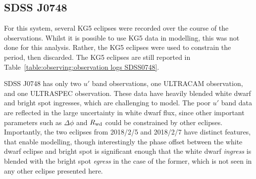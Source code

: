 \newpage
\subsection{SDSS J0748}

For this system, several KG5 eclipses were recorded over the course of the observations. Whilst it is possible to use KG5 data in modelling, this was not done for this analysis. Rather, the KG5 eclipses were used to constrain the period, then discarded. The KG5 eclipses are still reported in Table~\ref{table:observing:observation logs SDSS0748}.

SDSS J0748 has only two $u'$ band observations, one ULTRACAM observation, and one ULTRASPEC observation. These data have heavily blended white dwarf and bright spot ingresses, which are challenging to model.
The poor $u'$ band data are reflected in the large uncertainty in white dwarf flux, since other important parameters such as $\Delta\phi$ and $R_{\rm wd}$ could be constrained by other eclipses. Importantly, the two eclipses from 2018/2/5 and 2018/2/7 have distinct features, that enable modelling, though interestingly the phase offset between the white dwarf eclipse and bright spot is significant enough that the white dwarf \textit{ingress} is blended with the bright spot \textit{egress} in the case of the former, which is not seen in any other eclipse presented here.


%     


